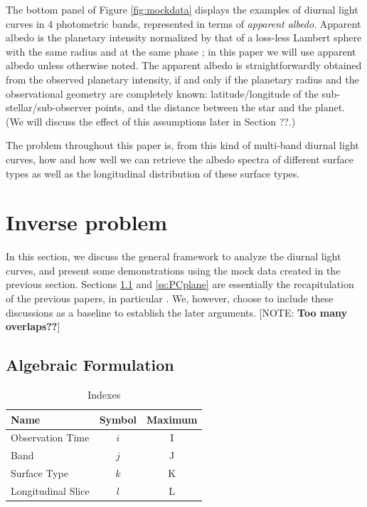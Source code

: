 \documentclass[iop,numberedappendix,apj,]{emulateapj}
\def\memoYF#1{\color{red}[NOTE: {\bf #1}]\color{black}}
\begin{document}
The bottom panel of Figure \ref{fig:mockdata} displays the examples of diurnal light curves in 4 photometric bands, represented in terms of {\it apparent albedo}. 
Apparent albedo is the planetary intensity normalized by that of a loss-less Lambert sphere with the same radius and at the same phase \citep{Qiu2003, Seager2010}; in this paper we will use apparent albedo unless otherwise noted. 
The apparent albedo is straightforwardly obtained from the observed planetary intensity, if and only if the planetary radius and the observational geometry are completely known: latitude/longitude of the sub-stellar/sub-observer points, and the distance between the star and the planet. 
(We will discuss the effect of this assumptions later in Section ??.)

The problem throughout this paper is, from this kind of multi-band diurnal light curves, how and how well we can retrieve the albedo spectra of different surface types as well as the longitudinal distribution of these surface types. 


\section{Inverse problem}
\label{s:frame}

In this section, we discuss the general framework to analyze the diurnal light curves, and present some demonstrations using the mock data created in the previous section. 
Sections \ref{ss:model} and \ref{ss:PCplane} are essentially the recapitulation of the previous papers, in particular \citet{Cowan2013} \citep[but see also][]{Cowan2009,Cowan2011,Fujii2010,Fujii2011}.  
We, however, choose to include these discussions as a baseline to establish the later arguments. 
\memoYF{Too many overlaps??}

\subsection{Algebraic Formulation}
\label{ss:model}


\begin{table}[b]
\caption{Indexes}
\begin{center}
\begin{tabular}{lcc} \hline \hline
Name & Symbol & Maximum \\ \hline
Observation Time & $i$ & I \\
Band & $j$ & J  \\
Surface Type & $k$ & K  \\
Longitudinal Slice  & $l$ & L \\ \hline
\end{tabular}
\end{center}
\label{tab:index}
\end{table}%
\end{document}
